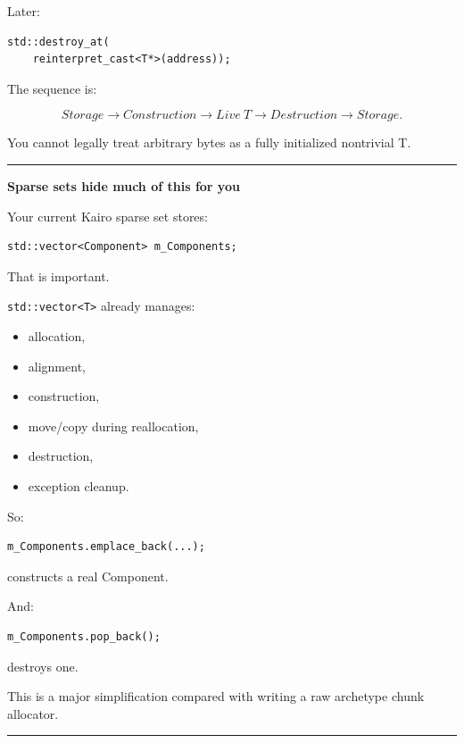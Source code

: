 Later:

\begin{verbatim}
std::destroy_at(
    reinterpret_cast<T*>(address));
\end{verbatim}

The sequence is:

\[
\boxed{
Storage
\rightarrow
Construction
\rightarrow
Live\ T
\rightarrow
Destruction
\rightarrow
Storage.
}
\]

You cannot legally treat arbitrary bytes as a fully initialized nontrivial T.

\begin{center}\rule{0.5\linewidth}{0.5pt}\end{center}

\textbf{Sparse sets hide much of this for you}

Your current Kairo sparse set stores:

\begin{verbatim}
std::vector<Component> m_Components;
\end{verbatim}

That is important.

\texttt{std::vector\textless{}T\textgreater{}} already manages:

\begin{itemize}
\tightlist
\item
  allocation,
\item
  alignment,
\item
  construction,
\item
  move/copy during reallocation,
\item
  destruction,
\item
  exception cleanup.
\end{itemize}

So:

\begin{verbatim}
m_Components.emplace_back(...);
\end{verbatim}

constructs a real Component.

And:

\begin{verbatim}
m_Components.pop_back();
\end{verbatim}

destroys one.

This is a major simplification compared with writing a raw archetype chunk allocator.

\begin{center}\rule{0.5\linewidth}{0.5pt}\end{center}

